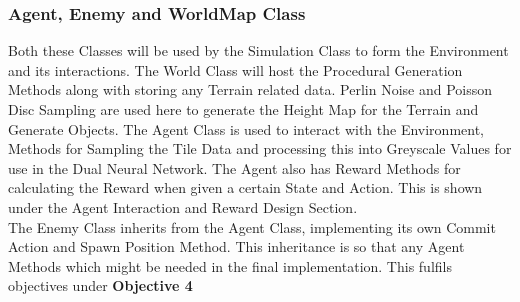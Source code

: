 \begin{flushleft}
            \subsubsection{Agent, Enemy and WorldMap Class}
                Both these Classes will be used by the Simulation Class to form the Environment and its interactions. The World Class will host the
                Procedural Generation Methods along with storing any Terrain related data. Perlin Noise and Poisson Disc Sampling are used here to
                generate the Height Map for the Terrain and Generate Objects. The Agent Class is used to interact with the Environment, Methods for 
                Sampling the Tile Data and processing this into Greyscale Values for use in the Dual Neural Network. The Agent also has Reward Methods
                for calculating the Reward when given a certain State and Action. This is shown under the Agent Interaction and Reward Design Section. \\
                \vspace{0.2cm}
                The Enemy Class inherits from the Agent Class, implementing its own Commit Action and Spawn Position Method. This inheritance is so 
                that any Agent Methods which might be needed in the final implementation.
                \vspace{0.2cm}
                This fulfils objectives under \textbf{Objective 4} \\


\end{flushleft}
